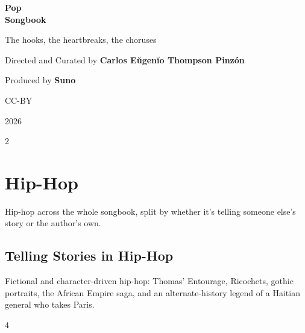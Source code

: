 \documentclass[a4paper,landscape]{memoir}
\begin{document}
\frontmatter
{}

\begin{titlingpage}
\centering
\vspace*{\fill}
{\LARGE\bfseries Pop\\\Huge Songbook\par}
\bigskip
{\large The hooks, the heartbreaks, the choruses\par}
\vspace*{\fill}
{\normalsize Directed and Curated by \bfseries Carlos Eŭgenĭo Thompson Pinzón\par}
{\normalsize Produced by \bfseries Suno\par}
\bigskip
{\normalsize CC-BY\par}
{\normalsize 2026\par}
\vspace*{\fill}
\end{titlingpage}

\clearpage\begin{multicols*}{2}
\tableofcontents*
\end{multicols*}
\mainmatter
\renewcommand\chaptername{Album~}

\part{Hip-Hop}
Hip-hop across the whole songbook, split by whether it's telling someone else's story or the author's own.

\chapter{Telling Stories in Hip-Hop}
Fictional and character-driven hip-hop: Thomas' Entourage, Ricochets, gothic portraits, the African Empire saga, and an alternate-history legend of a Haitian general who takes Paris.
\clearpage\begin{multicols*}{4}
\end{multicols*}
\end{document}
